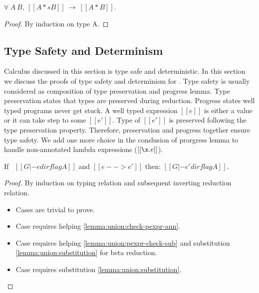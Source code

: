\begin{lemma}[Completeness]
\label{lemma:union:complete}
$\forall ~ A ~ B, ~[[A *s B]] ~ \rightarrow ~ [[A * B]]$.
\end{lemma}

\begin{proof}
By induction on type A.
\end{proof}

\subsection{Type Safety and Determinism}
\label{sec:union:safety}
Calculus discussed in this section is type safe and deterministic. In this section we discuss the
proofs of type safety and determinism for \cal. Type safety is usually considered as composition
of type preservation and progress lemma. Type preservation states that types are preserved during
reduction. Progress states well typed programs never get stuck. A well typed expression $[[e]]$ is 
either a value or it can take step to some $[[e']]$. Type of $[[e']]$ is preserved following the
type preservation property. Therefore, preservation and progress together ensure type safety.
We add one more choice in the conslusion of prorgress lemma to handle non-annotated lambda expressions 
($[[\x.e]]$).

\begin{lemma}
\label{lemma:union:preservation}
  If \ $[[G |- e dirflag A]]$ and $[[e --> e']]$ then: $[[G |- e' dirflag A]]$.
\end{lemma}

\begin{proof}
  By induction on typing relation and subsequent inverting reduction relation.
  \begin{itemize}
    \item Cases  are trivial to prove.
    \item Case  requires helping \cref{lemma:union:check-pexpr-ann}.
    \item Case  requires helping \cref{lemma:union:pexpr-check-sub}
          and substitution \cref{lemma:union:substitution} for beta reduction.
    \item Case  requires substitution \cref{lemma:union:substitution}.
  \end{itemize}
\end{proof}

